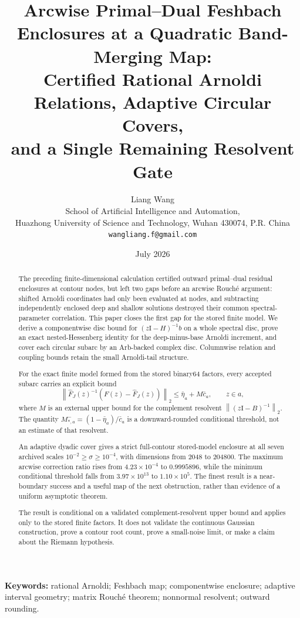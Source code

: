 \documentclass[11pt]{article}
\title{\textbf{Arcwise Primal--Dual Feshbach Enclosures at a Quadratic Band-Merging Map:}\\[0.35em]
\large Certified Rational Arnoldi Relations, Adaptive Circular Covers,\\
and a Single Remaining Resolvent Gate}
\author{Liang Wang\\
\small School of Artificial Intelligence and Automation,\\[-0.2em]
\small Huazhong University of Science and Technology, Wuhan 430074, P.R. China\\
\small \texttt{wangliang.f@gmail.com}}
\date{July 2026}
\theoremstyle{definition}
\theoremstyle{remark}
\newcommand{\Id}{\mathrm I}
\newcommand{\norm}[1]{\left\lVert#1\right\rVert}
\begin{document}
\maketitle

\begin{abstract}
The preceding finite-dimensional calculation certified outward primal--dual
residual enclosures at contour nodes, but left two gaps before an arcwise
Rouché argument: shifted Arnoldi coordinates had only been evaluated at
nodes, and subtracting independently enclosed deep and shallow solutions
destroyed their common spectral-parameter correlation.  This paper closes
the first gap for the stored finite model.  We derive a componentwise disc
bound for $(z\Id-H)^{-1}b$ on a whole spectral disc, prove an exact
nested-Hessenberg identity for the deep-minus-base Arnoldi increment, and
cover each circular subarc by an Arb-backed complex disc.  Columnwise
relation and coupling bounds retain the small Arnoldi-tail structure.

For the exact finite model formed from the stored binary64 factors, every
accepted subarc carries an explicit bound
\[
 \norm{\widehat F_J(z)^{-1}(F(z)-\widehat F_J(z))}_2
 \leq \bar\eta_a+M\bar c_a,\qquad z\in a,
\]
where $M$ is an external upper bound for the complement resolvent
$\norm{(z\Id-B)^{-1}}_2$.  The quantity
$M_{*,a}^-=(1-\bar\eta_a)/\bar c_a$ is a downward-rounded conditional
threshold, not an estimate of that resolvent.

An adaptive dyadic cover gives a strict full-contour stored-model enclosure
at all seven archived scales $10^{-2}\geq\sigma\geq10^{-4}$, with dimensions
from 2048 to 204800.  The maximum arcwise correction ratio rises from
$4.23\times10^{-4}$ to $0.9995896$, while the minimum conditional threshold
falls from $3.97\times10^{13}$ to $1.10\times10^5$.  The finest result is a
near-boundary success and a useful map of the next obstruction, rather than
evidence of a uniform asymptotic theorem.

The result is conditional on a validated complement-resolvent upper bound
and applies only to the stored finite factors.  It does not validate the
continuous Gaussian construction, prove a contour root count, prove a
small-noise limit, or make a claim about the Riemann hypothesis.
\end{abstract}

\noindent\textbf{Keywords:} rational Arnoldi; Feshbach map; componentwise
enclosure; adaptive interval geometry; matrix Rouché theorem; nonnormal
resolvent; outward rounding.
\end{document}
